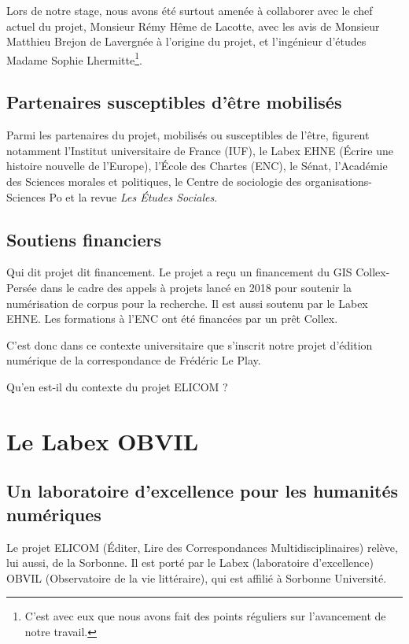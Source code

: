 Lors de notre stage, nous avons été surtout amenée à collaborer avec le chef actuel du projet, Monsieur Rémy Hême de Lacotte, avec les avis de Monsieur Matthieu Brejon de Lavergnée à l'origine du projet, et l'ingénieur d'études Madame Sophie Lhermitte\footnote{C'est avec eux que nous avons fait des points réguliers sur l'avancement de notre travail.}. 

\subsection{Partenaires susceptibles d’être mobilisés}

Parmi les partenaires du projet, mobilisés ou susceptibles de l'être, figurent notamment l'Institut universitaire de France (IUF), le Labex EHNE (Écrire une histoire nouvelle de l’Europe), l'École des Chartes (ENC), le Sénat, l'Académie des Sciences morales et politiques, le Centre de sociologie des organisations-Sciences Po et la revue \emph{Les Études Sociales}.

\subsection{Soutiens financiers}
	
Qui dit projet dit financement.
Le projet a reçu un financement du GIS Collex-Persée dans le cadre des appels à projets lancé en 2018 pour soutenir la numérisation de corpus pour la recherche. Il est aussi soutenu par le Labex EHNE. 
Les formations à l’ENC ont été financées par un prêt Collex.

C'est donc dans ce contexte universitaire que s'inscrit notre projet d'édition numérique de la correspondance de Frédéric Le Play. 

Qu'en est-il du contexte du projet ELICOM ?

\section{Le Labex OBVIL}

\subsection{Un laboratoire d'excellence pour les humanités numériques}

Le projet ELICOM (Éditer, Lire des Correspondances Multidisciplinaires) relève, lui aussi, de la Sorbonne. Il est porté par le Labex (laboratoire d'excellence) OBVIL (Observatoire de la vie littéraire), qui est affilié à Sorbonne Université.

